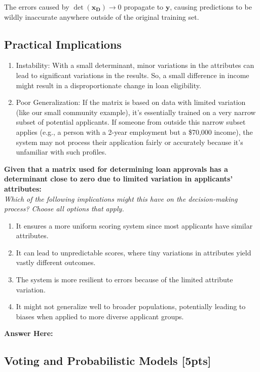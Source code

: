 \documentclass{article}
\begin{document}
The errors caused by $\det(\mathbf{x_D}) \rightarrow 0$ propagate to $\mathbf{y}$, causing predictions to be wildly inaccurate anywhere outside of the original training set.

\subsection*{Practical Implications}

\begin{enumerate}
    \item Instability: With a small determinant, minor variations in the attributes can lead to significant variations in the results. So, a small difference in income might result in a disproportionate change in loan eligibility.
    \item Poor Generalization: If the matrix is based on data with limited variation (like our small community example), it's essentially trained on a very narrow subset of potential applicants. If someone from outside this narrow subset applies (e.g., a person with a 2-year employment but a \$70,000 income), the system may not process their application fairly or accurately because it's unfamiliar with such profiles.
\end{enumerate}

\noindent
\textbf{Given that a matrix used for determining loan approvals has a determinant close to zero due to limited variation in applicants' attributes:} \\
\textit{Which of the following implications might this have on the decision-making process? Choose all options that apply.}
\begin{enumerate}[label=\Alph*)]
    \item It ensures a more uniform scoring system since most applicants have similar attributes.
    \item It can lead to unpredictable scores, where tiny variations in attributes yield vastly different outcomes.
    \item The system is more resilient to errors because of the limited attribute variation.
    \item It might not generalize well to broader populations, potentially leading to biases when applied to more diverse applicant groups.
\end{enumerate}
\textbf{Answer Here:}

\newpage

\subsection{Voting and Probabilistic Models [5pts]}
\end{document}
